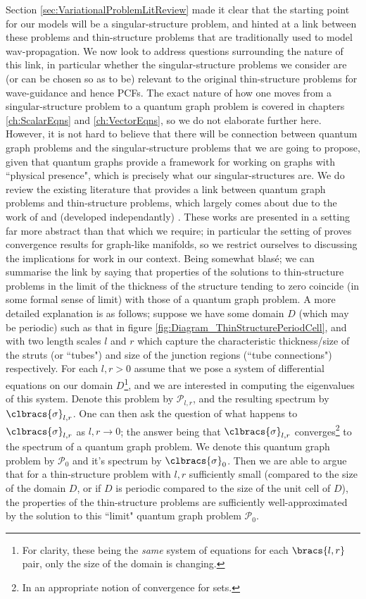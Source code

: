 Section \ref{sec:VariationalProblemLitReview} made it clear that the starting point for our models will be a singular-structure problem, and hinted at a link between these problems and thin-structure problems that are traditionally used to model wav-propagation.
We now look to address questions surrounding the nature of this link, in particular whether the singular-structure problems we consider are (or can be chosen so as to be) relevant to the original thin-structure problems for wave-guidance and hence PCFs.
The exact nature of how one moves from a singular-structure problem to a quantum graph problem is covered in chapters \ref{ch:ScalarEqns} and \ref{ch:VectorEqns}, so we do not elaborate further here.
However, it is not hard to believe that there will be connection between quantum graph problems and the singular-structure problems that we are going to propose, given that quantum graphs provide a framework for working on graphs with ``physical presence", which is precisely what our singular-structures are.
We do review the existing literature that provides a link between quantum graph problems and thin-structure problems, which largely comes about due to the work of \cite{kuchment2001convergence} and (developed independantly) \cite{exner2005convergence}.
These works are presented in a setting far more abstract than that which we require; in particular the setting of \cite{exner2005convergence} proves convergence results for graph-like manifolds, so we restrict ourselves to discussing the implications for work in our context.
Being somewhat blas\'e; we can summarise the link by saying that properties of the solutions to thin-structure problems in the limit of the thickness of the structure tending to zero coincide (in some formal sense of limit) with those of a quantum graph problem.
A more detailed explanation is as follows; suppose we have some domain $D$ (which may be periodic) such as that in figure \ref{fig:Diagram_ThinStructurePeriodCell}, and with two length scales $l$ and $r$ which capture the characteristic thickness/size of the struts (or ``tubes") and size of the junction regions (``tube connections") respectively.
For each $l,r>0$ assume that we pose a system of differential equations on our domain $D$\footnote{For clarity, these being the \emph{same} system of equations for each $\bracs{l,r}$ pair, only the size of the domain is changing.}, and we are interested in computing the eigenvalues of this system.
Denote this problem by $\mathcal{P}_{l,r}$, and the resulting spectrum by $\clbracs{\sigma}_{l,r}$.
One can then ask the question of what happens to $\clbracs{\sigma}_{l,r}$ as $l,r\rightarrow0$; the answer being that $\clbracs{\sigma}_{l,r}$ converges\footnote{In an appropriate notion of convergence for sets.} to the spectrum of a quantum graph problem.
We denote this quantum graph problem by $\mathcal{P}_0$ and it's spectrum by $\clbracs{\sigma}_0$.
Then we are able to argue that for a thin-structure problem with $l,r$ sufficiently small (compared to the size of the domain $D$, or if $D$ is periodic compared to the size of the unit cell of $D$), the properties of the thin-structure problems are sufficiently well-approximated by the solution to this ``limit" quantum graph problem $\mathcal{P}_0$. \newline

